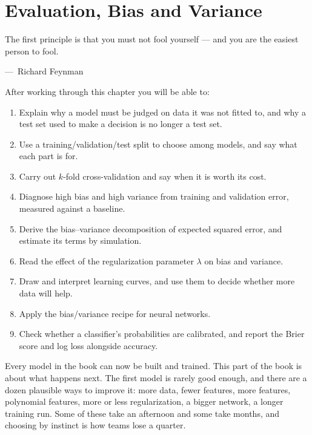 
\chapter{Evaluation, Bias and Variance}
\label{ch:ch10}

\epigraph{The first principle is that you must not fool yourself --- and you
are the easiest person to fool.}{---\ Richard Feynman}

\begin{chapterlearning}
After working through this chapter you will be able to:
\begin{enumerate}
  \item Explain why a model must be judged on data it was not fitted to, and why
        a test set used to make a decision is no longer a test set.
  \item Use a training/validation/test split to choose among models, and say
        what each part is for.
  \item Carry out $k$-fold cross-validation and say when it is worth its cost.
  \item Diagnose high bias and high variance from training and validation error,
        measured against a baseline.
  \item Derive the bias--variance decomposition of expected squared error, and
        estimate its terms by simulation.
  \item Read the effect of the regularization parameter $\lambda$ on bias and
        variance.
  \item Draw and interpret learning curves, and use them to decide whether more
        data will help.
  \item Apply the bias/variance recipe for neural networks.
  \item Check whether a classifier's probabilities are calibrated, and report the
        Brier score and log loss alongside accuracy.
\end{enumerate}
\end{chapterlearning}

Every model in the book can now be built and trained. This part of the book is
about what happens next. The first model is rarely good enough, and there are a
dozen plausible ways to improve it: more data, fewer features, more features,
polynomial features, more or less regularization, a bigger network, a longer
training run. Some of these take an afternoon and some take months, and choosing
by instinct is how teams lose a quarter.

